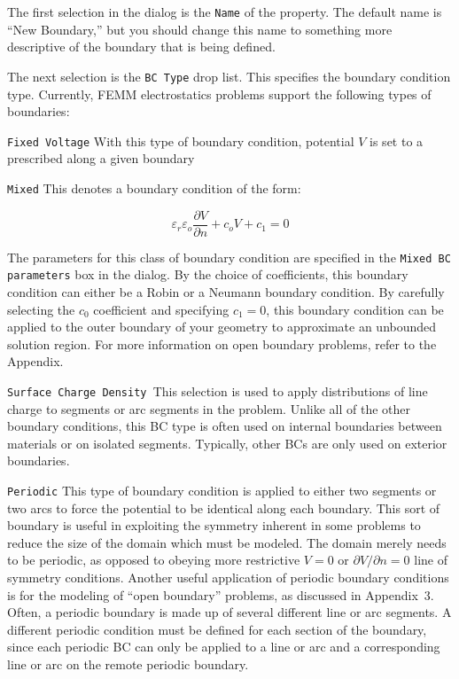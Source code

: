 \documentclass[12pt]{report}
\begin{document}
The first selection in the dialog is the \texttt{Name} of the
property. The default name is ``New Boundary,'' but you should
change this name to something more descriptive of the boundary that
is being defined.

The next selection is the \texttt{BC Type} drop list. This
specifies the boundary condition type. Currently, FEMM electrostatics problems 
support the following types of boundaries:

\texttt{Fixed Voltage} With this type of boundary condition, potential $V$ is
set to a prescribed along a given boundary

\texttt{Mixed} This denotes a boundary condition of the form:

\begin{equation}
\label{eq7}
\varepsilon _r \varepsilon _o \frac{\partial V}{\partial n} + c_o V + c_1 =
0
\end{equation}

The parameters for this class of boundary condition are specified in the
\texttt{Mixed BC parameters} box in the dialog. By the choice of
coefficients, this boundary condition can either be a Robin or a Neumann
boundary condition. By carefully selecting the $c_0 $ coefficient and
specifying $c_1 = 0$, this boundary condition can be applied to the outer
boundary of your geometry to approximate an unbounded solution region. For
more information on open boundary problems, refer to the Appendix.

\texttt{Surface Charge Density }This selection is used to apply
distributions of line charge to segments or arc segments in the problem.
Unlike all of the other boundary conditions, this BC type is often used on
internal boundaries between materials or on isolated segments. Typically,
other BCs are only used on exterior boundaries.

\texttt{Periodic} This type of boundary condition is applied to either two
segments or two arcs to force the potential to be identical along each
boundary. This sort of boundary is useful in exploiting the symmetry
inherent in some problems to reduce the size of the domain which must be
modeled. The domain merely needs to be periodic, as opposed to obeying more
restrictive $V = 0$ or $\partial V / \partial n = 0$ line of symmetry
conditions. Another useful application of periodic boundary conditions is
for the modeling of ``open boundary'' problems, as discussed in Appendix~3.
Often, a periodic boundary is made up of several different line or arc
segments. A different periodic condition must be defined for each section of
the boundary, since each periodic BC can only be applied to a line or arc
and a corresponding line or arc on the remote periodic boundary.
\end{document}
